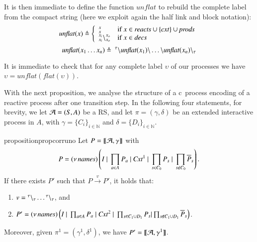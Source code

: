 It is then immediate to define the function $\mathit{unflat}$ to rebuild the complete label from the compact string (here we exploit again the half link and block notation):
$$
\mathit{unflat}(x) \triangleq\left\{
\begin{array}{ll}
^{x}_{x} & \mbox{if $x\in \mathit{reacts}\cup\{\mathit{cxt}\}\cup\mathit{prods}$}\\
^{x_i}_{x_i}\backslash^{x_o}_{x_o} & \mbox{if $x\in \mathit{decs}$}\\
\end{array}
\right.
$$
$$
\mathit{unflat}(x_1\dots x_n) \triangleq\ ^{\tau}\backslash \mathit{unflat}(x_1) \backslash \dots \backslash \mathit{unflat}(x_n) \backslash_{\tau}
$$

It is immediate to check that for any complete label $\upsilon$ of our processes we have
$\upsilon = \mathit{unflat}(\mathit{flat}(\upsilon))$.


With the next proposition, we analyse the structure of a c\CNA \ 
process encoding of  a reactive process after one transition step.
In the following four statements, for brevity, we let ${\cal A} = (S, A)$ be a RS, and let  $\pi=(\gamma,\delta)$ be an extended interactive process in $A$, with $\gamma=\{C_i\}_{i\in\mathbb{N}}$ and $\delta=\{D_i\}_{i\in\mathbb{N}}$. 

 \begin{restatable}[Correctness 1]{proposition}{propcorruno}
 \label{prop:corr1}
 Let 
 $P=\llbracket{\cal A},\gamma\rrbracket$ with
$$P  = (\nu\, \mathit{names}) \left(I~|~\prod_{a \in A}P_a ~|~ \mathit{Cxt}^1 ~|~ \prod_{s \in C_0}P_s ~|~ \prod_{s \notin C_0}\overline{P}_s\right).
$$
 If there exists  $P'$  such that $P \xrightarrow{v}P'$,  it holds that:
 \begin{enumerate}
 \item
  $v={}^{\tau} \backslash_{\tau}\dots{}^{\tau} \backslash_{\tau}$, and
  \item 
 $P'= (\nu\, \mathit{names}) \left(I~|~\prod_{a \in A}P_a~|~ \mathit{Cxt}^2 ~|~ \prod_{s \in C_1 \cup D_1}P_s| \prod_{s \notin C_1 \cup D_1}\overline{P}_s\right)$.
 \end{enumerate}
Moreover, given $\pi^1=(\gamma^1,\delta^1)$, we have $P' = \llbracket {\cal A},\gamma^1\rrbracket$.
\end{restatable}
 
